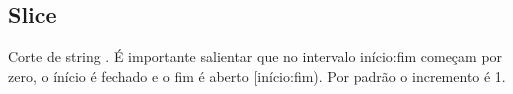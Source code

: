 \documentclass[letterpaper,10pt,brazil]{sphinxmanual}
\begin{document}
\begin{sphinxVerbatim}[commandchars=\\\{\}]
\end{sphinxVerbatim}

\begin{sphinxVerbatim}[commandchars=\\\{\}]
\end{sphinxVerbatim}

\begin{sphinxVerbatim}[commandchars=\\\{\}]
\end{sphinxVerbatim}

\begin{sphinxVerbatim}[commandchars=\\\{\}]
\end{sphinxVerbatim}


\subsection{Slice}
\label{\detokenize{content/str:slice}}
\begin{DUlineblock}{0em}
\item[] Corte de string \sphinxhyphen{} .
É importante salientar que no intervalo início:fim começam por zero, o ínício é fechado e o fim é aberto {[}início:fim).
Por padrão o incremento é 1.
\end{DUlineblock}

\begin{sphinxVerbatim}[commandchars=\\\{\}]
\end{sphinxVerbatim}

\begin{sphinxVerbatim}[commandchars=\\\{\}]
\end{sphinxVerbatim}
\end{document}
